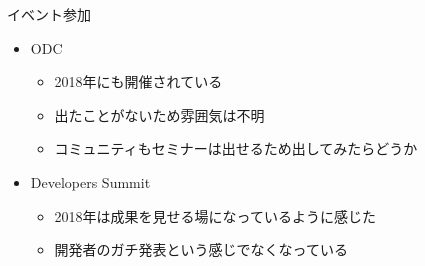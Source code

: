 \documentclass[mingoth,a4paper]{jsarticle}
\begin{document}
イベント参加
\begin{itemize}
\item ODC
    \begin{itemize}
    \item 2018年にも開催されている
    \item 出たことがないため雰囲気は不明
    \item コミュニティもセミナーは出せるため出してみたらどうか
    \end{itemize}
\item Developers Summit
    \begin{itemize}
    \item 2018年は成果を見せる場になっているように感じた
    \item 開発者のガチ発表という感じでなくなっている
    \end{itemize}
\end{itemize}
\end{document}
